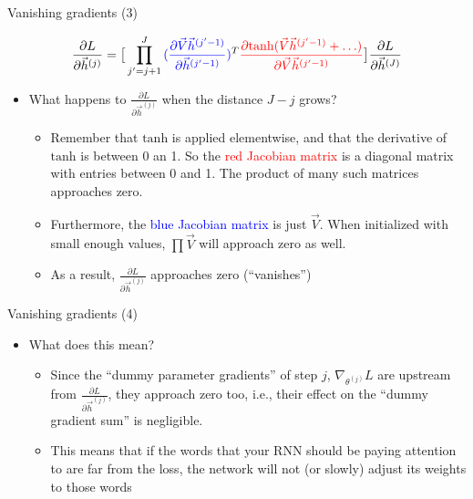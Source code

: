 \begin{vbframe}{Vanishing gradients (3)}

\vfill

$$
\frac{\partial L}{\partial \vec h^{(j)}} = \big[\prod_{j'=j+1}^{J} \textcolor{blue}{(\frac{\partial \vec V \vec h^{(j'-1)}}{\partial \vec h^{(j'-1)}})}^T \textcolor{red}{ \frac{\partial \mathrm{tanh}(\vec V \vec h^{(j'-1)} + \ldots)}{\partial \vec V \vec h^{(j'-1)}}} \big] \frac{\partial L}{\partial \vec h^{(J)}}
$$
\begin{itemize}
	\item What happens to $\frac{\partial L}{\partial \vec h^{(j)}}$ when the distance $J-j$ grows?
		\begin{itemize}
			\item Remember that $\mathrm{tanh}$ is applied elementwise, and that the derivative of $\mathrm{tanh}$ is between 0 an 1. So the \textcolor{red}{red Jacobian matrix} is a diagonal matrix with entries between 0 and 1.
			The product of many such matrices approaches zero.
			\item Furthermore, the \textcolor{blue}{blue Jacobian matrix} is just $\vec V$. When initialized with small enough values, $\prod \vec V$ will approach zero as well.
			\item As a result, $\frac{\partial L}{\partial \vec h^{(j)}}$ approaches zero (``vanishes'')
		\end{itemize}
\end{itemize}

\vfill

\end{vbframe}


\begin{vbframe}{Vanishing gradients (4)}

\vfill

\begin{itemize}
\item What does this mean?
	\begin{itemize}
		\item Since the ``dummy parameter gradients'' of step $j$, $\nabla_{\theta^{(j)}} L$ are upstream from $\frac{\partial L}{\partial \vec h^{(j)}}$, they approach zero too, i.e., their effect on the ``dummy gradient sum'' is negligible.
		\item This  means that if the words that your RNN should be paying attention to are far from the loss, the network will not (or slowly) adjust its weights to those words
	\end{itemize}
\end{itemize}

\vfill

\end{vbframe}

